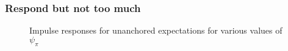 \documentclass[10pt]{beamer}
\def \myFigPath {../../../figures/}
\def\fignameIRFpsipiSmall{RIR_unanch_psi_pi1_01_command_IRFs_approx_pretty_2020_09_17}
\def\fignameIRFpsipiMedium{RIR_unanch_psi_pi1_5_command_IRFs_approx_pretty_2020_09_17}
\def\fignameIRFpsipiBig{RIR_unanch_psi_pi2_command_IRFs_approx_pretty_2020_09_17}
\begin{document}
\begin{frame}
	\frametitle{Respond but not too much}

\begin{figure}[h!]
{}
\caption{Impulse responses for unanchored expectations for various values of $\psi_{\pi}$}
\label{IRF_unanchored_psi}
\end{figure}

\end{frame}

%	
%
%
%
%
%
%
%
%
%
%
%
\end{document}

